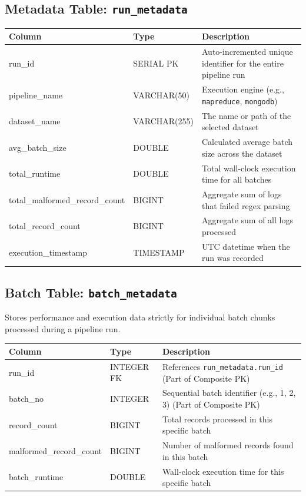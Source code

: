 \documentclass[11pt,a4paper]{article}
\begin{document}
\subsection{Metadata Table: \texttt{run\_metadata}}

\begin{schematable}
\begin{tabularx}{\linewidth}{@{} >{\ttfamily\small}l >{\small}l X @{}}
\toprule
\textnormal{\textbf{Column}} & \textbf{Type} & \textbf{Description} \\
\midrule
run\_id                 & SERIAL PK    & Auto-incremented unique identifier for the entire pipeline run \\
pipeline\_name          & VARCHAR(50)  & Execution engine (e.g., \texttt{mapreduce}, \texttt{mongodb}) \\
dataset\_name           & VARCHAR(255) & The name or path of the selected dataset \\
avg\_batch\_size        & DOUBLE       & Calculated average batch size across the dataset \\
total\_runtime          & DOUBLE       & Total wall-clock execution time for all batches \\
total\_malformed\_record\_count & BIGINT & Aggregate sum of logs that failed regex parsing \\
total\_record\_count    & BIGINT       & Aggregate sum of all logs processed \\
execution\_timestamp    & TIMESTAMP    & UTC datetime when the run was recorded \\
\bottomrule
\end{tabularx}
\end{schematable}

\subsection{Batch Table: \texttt{batch\_metadata}}

Stores performance and execution data strictly for individual batch chunks processed during a pipeline run.

\begin{schematable}
\begin{tabularx}{\linewidth}{@{} >{\ttfamily\small}l >{\small}l X @{}}
\toprule
\textnormal{\textbf{Column}} & \textbf{Type} & \textbf{Description} \\
\midrule
run\_id                 & INTEGER FK & References \texttt{run\_metadata.run\_id} (Part of Composite PK) \\
batch\_no               & INTEGER    & Sequential batch identifier (e.g., 1, 2, 3) (Part of Composite PK) \\
record\_count           & BIGINT     & Total records processed in this specific batch \\
malformed\_record\_count & BIGINT     & Number of malformed records found in this batch \\
batch\_runtime          & DOUBLE     & Wall-clock execution time for this specific batch \\
\bottomrule
\end{tabularx}
\end{schematable}
\end{document}

